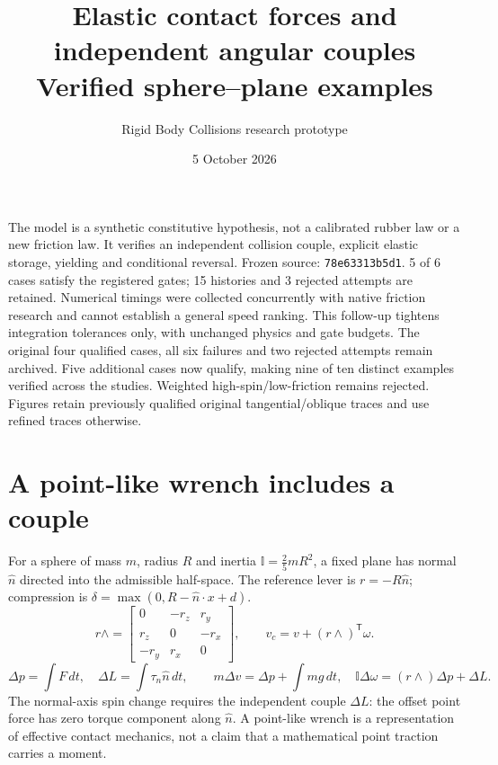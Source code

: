 \documentclass[10pt]{article}
\title{Elastic contact forces and independent angular couples\\Verified sphere--plane examples}
\author{Rigid Body Collisions research prototype}
\date{5 October 2026}
\begin{document}
\maketitle
The model is a synthetic constitutive hypothesis, not a calibrated rubber law or a new friction law. It verifies an independent collision couple, explicit elastic storage, yielding and conditional reversal. Frozen source: \texttt{78e63313b5d1}. 5 of 6 cases satisfy the registered gates; 15 histories and 3 rejected attempts are retained. Numerical timings were collected concurrently with native friction research and cannot establish a general speed ranking.
This follow-up tightens integration tolerances only, with unchanged physics and gate budgets. The original four qualified cases, all six failures and two rejected attempts remain archived. Five additional cases now qualify, making nine of ten distinct examples verified across the studies. Weighted high-spin/low-friction remains rejected. Figures retain previously qualified original tangential/oblique traces and use refined traces otherwise.
\section*{A point-like wrench includes a couple}
For a sphere of mass $m$, radius $R$ and inertia $\mathbb I=\frac25mR^2$, a fixed plane has normal $\hat n$ directed into the admissible half-space. The reference lever is $r=-R\hat n$; compression is $\delta=\max(0,R-\hat n\cdot x+d)$.
\[
r\wedge=\begin{bmatrix}0&-r_z&r_y\\r_z&0&-r_x\\-r_y&r_x&0\end{bmatrix},\qquad
v_c=v+(r\wedge)^\mathsf{T}\omega.
\]
\[
\Delta p=\int F\,dt,\quad \Delta L=\int \tau_n\hat n\,dt,\qquad
m\Delta v=\Delta p+\int mg\,dt,\quad
\mathbb I\Delta\omega=(r\wedge)\Delta p+\Delta L.
\]
The normal-axis spin change requires the independent couple $\Delta L$: the offset point force has zero torque component along $\hat n$. A point-like wrench is a representation of effective contact mechanics, not a claim that a mathematical point traction carries a moment.
\end{document}
